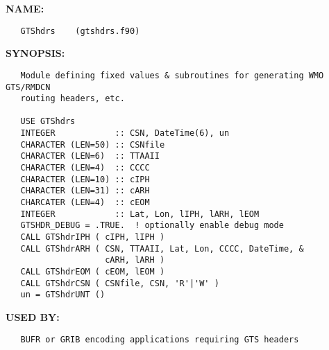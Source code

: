 \label{ch:robo12}
\label{ch:BUFR_GTSHDRS_GTShdrs}
\textbf{NAME:}\hspace{0.08in}\begin{Verbatim}
   GTShdrs    (gtshdrs.f90)
\end{Verbatim}
\textbf{SYNOPSIS:}\hspace{0.08in}\begin{Verbatim}
   Module defining fixed values & subroutines for generating WMO GTS/RMDCN
   routing headers, etc.

   USE GTShdrs
   INTEGER            :: CSN, DateTime(6), un
   CHARACTER (LEN=50) :: CSNfile
   CHARACTER (LEN=6)  :: TTAAII
   CHARACTER (LEN=4)  :: CCCC
   CHARACTER (LEN=10) :: cIPH
   CHARACTER (LEN=31) :: cARH
   CHARCATER (LEN=4)  :: cEOM
   INTEGER            :: Lat, Lon, lIPH, lARH, lEOM
   GTSHDR_DEBUG = .TRUE.  ! optionally enable debug mode
   CALL GTShdrIPH ( cIPH, lIPH )
   CALL GTShdrARH ( CSN, TTAAII, Lat, Lon, CCCC, DateTime, &
                    cARH, lARH )
   CALL GTShdrEOM ( cEOM, lEOM )
   CALL GTShdrCSN ( CSNfile, CSN, 'R'|'W' )
   un = GTShdrUNT ()
\end{Verbatim}
\textbf{USED BY:}\hspace{0.08in}\begin{Verbatim}
   BUFR or GRIB encoding applications requiring GTS headers
\end{Verbatim}
